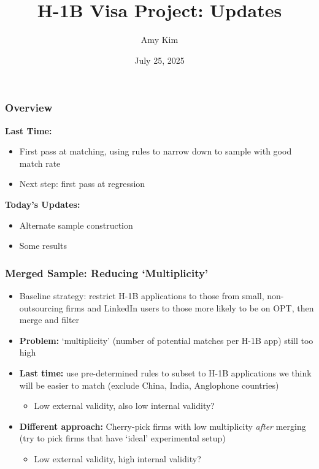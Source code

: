 \documentclass[xcolor=dvipsnames, compress, 12pt, aspectratio=169, handout]{beamer}
\title{H-1B Visa Project: Updates}
\author{Amy Kim}
\date{July 25, 2025}
\begin{document}
\begin{frame}
    \frametitle{Overview}
    \textbf{Last Time:}
    \begin{itemize}
        \item First pass at matching, using rules to narrow down to sample with good match rate 
        \item Next step: first pass at regression
    \end{itemize}    
    \vspace{2mm}
    \textbf{Today's Updates:}
    \begin{itemize}
        \item Alternate sample construction 
        \item Some results 
    \end{itemize}
\end{frame}

\begin{frame}
    \frametitle{Merged Sample: Reducing `Multiplicity'}
    \begin{itemize}
        \item Baseline strategy: restrict H-1B applications to those from small, non-outsourcing firms and LinkedIn users to those more likely to be on OPT, then merge and filter 
        \vspace{2mm}
        \item \textbf{Problem:} `multiplicity' (number of potential matches per H-1B app) still too high  \vspace{2mm}
        \item \textbf{Last time:} use pre-determined rules to subset to H-1B applications we think will be easier to match (exclude China, India, Anglophone countries)
        \begin{itemize}
            \item Low external validity, also low internal validity?
        \end{itemize} \vspace{2mm}
        \item \textbf{Different approach:} Cherry-pick firms with low multiplicity \textit{after} merging (try to pick firms that have `ideal' experimental setup)
        \begin{itemize}
            \item Low external validity, high internal validity?
        \end{itemize}
    \end{itemize}
\end{frame}
\end{document}
